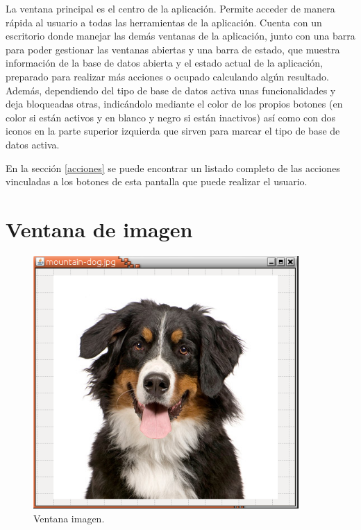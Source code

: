 La ventana principal es el centro de la aplicación. Permite acceder de manera rápida al usuario a todas las herramientas de la aplicación. Cuenta con un escritorio donde manejar las demás ventanas de la aplicación, junto con una barra para poder gestionar las ventanas abiertas y una barra de estado, que muestra información de la base de datos abierta y el estado actual de la aplicación, preparado para realizar más acciones o ocupado calculando algún resultado.\\

Además, dependiendo del tipo de base de datos activa unas funcionalidades y deja bloqueadas otras, indicándolo mediante el color de los propios botones (en color si están activos y en blanco y negro si están inactivos) así como con dos iconos en la parte superior izquierda que sirven para marcar el tipo de base de datos activa.

En la sección \ref{acciones} se puede encontrar un listado completo de las acciones vinculadas a los botones de esta pantalla que puede realizar el usuario.\\

\newpage
 
\section{Ventana de imagen}
\begin{figure}[H]
\begin{center}

\includegraphics[width=0.9\textwidth]{img/v-imagen.png}
\end{center}

\caption{Ventana imagen.}
\end{figure}

